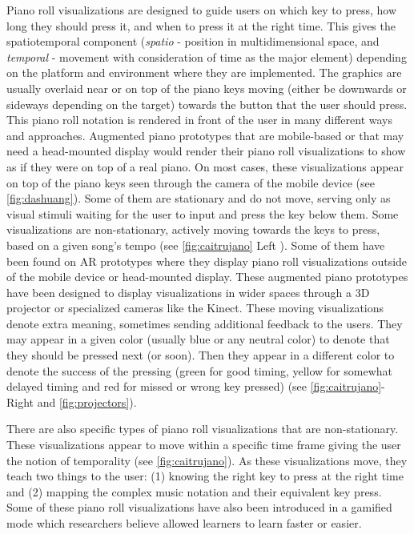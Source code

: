 \documentclass[sigconf, screen, review]{acmart}
\begin{document}
Piano roll visualizations are designed to guide users on which key to press, how long they should press it, and when to press it at the right time. This gives the spatiotemporal component (\textit{spatio} - position in multidimensional space, and \textit{temporal} - movement with consideration of time as the major element) depending on the platform and environment where they are implemented. The graphics are usually overlaid near or on top of the piano keys moving (either be downwards or sideways depending on the target) towards the button that the user should press. This piano roll notation is rendered in front of the user in many different ways and approaches. Augmented piano prototypes that are mobile-based or that may need a head-mounted display would render their piano roll visualizations to show as if they were on top of a real piano. On most cases, these visualizations appear on top of the piano keys seen through the camera of the mobile device (see \autoref{fig:dashuang}). Some of them are stationary and do not move, serving only as visual stimuli waiting for the user to input and press the key below them. Some visualizations are non-stationary, actively moving towards the keys to press, based on a given song's tempo (see \autoref{fig:caitrujano} Left ). Some of them have been found on AR prototypes where they display piano roll visualizations outside of the mobile device or head-mounted display. These augmented piano prototypes have been designed to display visualizations in wider spaces through a 3D projector or specialized cameras like the Kinect. These moving visualizations denote extra meaning, sometimes sending additional feedback to the users. They may appear in a given color (usually blue or any neutral color) to denote that they should be pressed next (or soon). Then they appear in a different color to denote the success of the pressing (green for good timing, yellow for somewhat delayed timing and red for missed or wrong key pressed) (see \autoref{fig:caitrujano}-Right and \ref{fig:projectors}). 

There are also specific types of piano roll visualizations that are non-stationary. These visualizations appear to move within a specific time frame giving the user the notion of temporality (see \autoref{fig:caitrujano}). As these visualizations move, they teach two things to the user: (1) knowing the right key to press at the right time and (2) mapping the complex music notation and their equivalent key press. Some of these piano roll visualizations have also been introduced in a gamified mode \cite{Weing:2013:PEI:2494091.2494113} which researchers believe allowed learners to learn faster or easier. 
\end{document}
